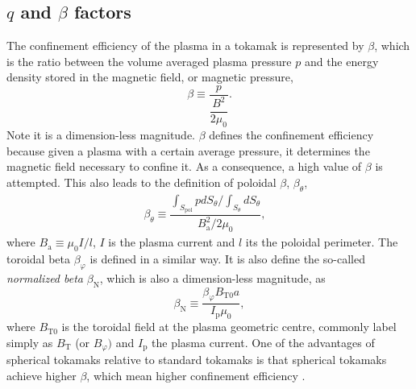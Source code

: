 \documentclass[a4paper,12pt,oneside]{book}
\begin{document}
\subsection{$q$ and $\beta$ factors}
\label{section q beta}
The confinement efficiency of the plasma in a tokamak is represented by $\beta$, which is the ratio between the volume averaged plasma pressure $p$ and the energy density stored in the magnetic field, or magnetic pressure,
%
\begin{equation} \label{def beta}
\beta \equiv \dfrac{p}{\dfrac{B^2}{2 \mu_{0}}}.
\end{equation}
%
Note it is a dimension-less magnitude. $\beta$ defines the confinement efficiency because given a plasma with a certain average pressure, it determines the magnetic field necessary to confine it. As a consequence, a high value of $\beta$ is attempted. This also leads to the definition of poloidal $\beta$, $\beta_{\theta}$,
%
\begin{equation}
\begin{array}{cc}

\beta_{\theta} \equiv \dfrac{\int_{S_\text{pol}} p dS_\theta / \int_{S_\theta} dS_\theta}{B_\text{a}^2/2 \mu_0}, &
\end{array}
\end{equation}
%
where $B_\text{a} \equiv \mu_0 I/l$, $I$ is the plasma current and $l$ its the poloidal perimeter. The toroidal beta $\beta_\varphi$ is defined in a similar way. It is also define the so-called \textit{normalized beta} $\beta_\text{N}$, which is also a dimension-less magnitude, as
%
\begin{equation}
\beta_\text{N} \equiv \dfrac{\beta_\varphi B_{\text{T}0} a}{I_\text{p} \mu_0},
\end{equation}
%
where $B_{\text{T}0}$ is the toroidal field at the plasma geometric centre, commonly label simply as $B_\text{T}$ (or $B_\varphi)$ and $I_\text{p}$ the plasma current. One of the advantages of spherical tokamaks relative to standard tokamaks is that spherical tokamaks achieve higher $\beta$, which mean higher confinement efficiency \cite{ST_vs_T}.
\end{document}
